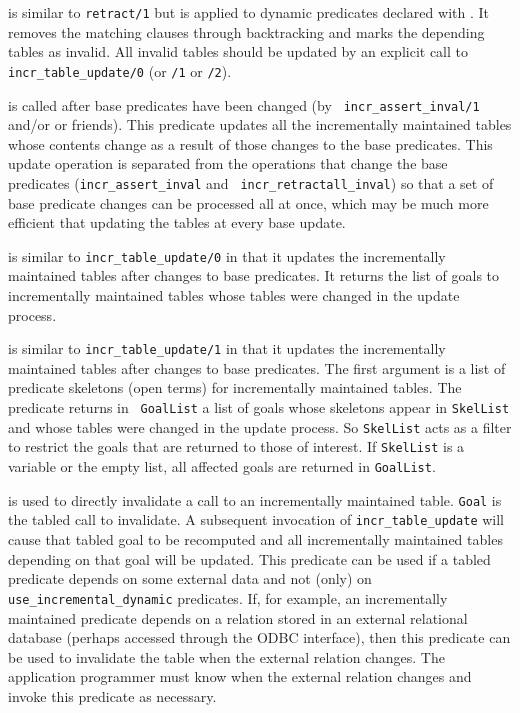 \begin{description}
is similar to {\tt retract/1} but is applied to dynamic predicates
declared with .  It removes the matching
clauses through backtracking and marks the depending tables as
invalid.  All invalid tables should be updated by an explicit call to
{\tt incr\_table\_update/0} (or {\tt /1} or {\tt /2}).

is called after base predicates have been changed (by {\tt
incr\_assert\_inval/1} and/or  or
friends).  This predicate updates all the incrementally maintained
tables whose contents change as a result of those changes to the base
predicates.  This update operation is separated from the operations
that change the base predicates ({\tt incr\_assert\_inval} and {\tt
incr\_retractall\_inval}) so that a set of base predicate changes can be
processed all at once, which may be much more efficient that updating
the tables at every base update.

is similar to {\tt incr\_table\_update/0} in that it updates the
incrementally maintained tables after changes to base predicates.  It
returns the list of goals to incrementally maintained tables whose
tables were changed in the update process.

is similar to {\tt incr\_table\_update/1} in that it updates the
incrementally maintained tables after changes to base predicates.  The
first argument is a list of predicate skeletons (open terms) for
incrementally maintained tables.  The predicate returns in {\tt
GoalList} a list of goals whose skeletons appear in {\tt SkelList} and
whose tables were changed in the update process.  So {\tt SkelList}
acts as a filter to restrict the goals that are returned to those of
interest.  If {\tt SkelList} is a variable or the empty list, all
affected goals are returned in {\tt GoalList}.

is used to directly invalidate a call to an incrementally maintained
table.  {\tt Goal} is the tabled call to invalidate.  A subsequent
invocation of {\tt incr\_table\_update} will cause that tabled goal to
be recomputed and all incrementally maintained tables depending on
that goal will be updated.  This predicate can be used if a tabled
predicate depends on some external data and not (only) on {\tt
use\_incremental\_dynamic} predicates.  If, for example, an incrementally
maintained predicate depends on a relation stored in an external
relational database (perhaps accessed through the ODBC interface),
then this predicate can be used to invalidate the table when the
external relation changes.  The application programmer must know when
the external relation changes and invoke this predicate as necessary.


\end{description}
